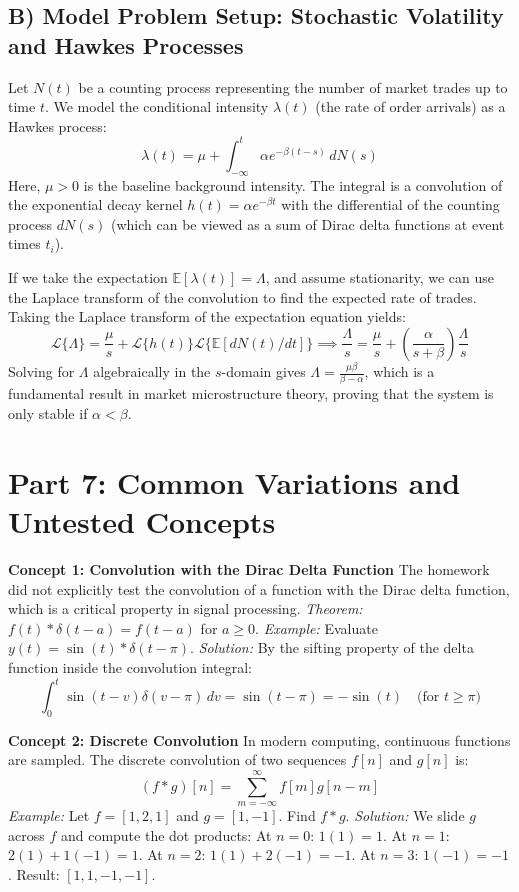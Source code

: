 \documentclass[11pt, letterpaper]{article}
\theoremstyle{definition}
\theoremstyle{remark}
\newcommand{\E}{\mathbb{E}}
\begin{document}
\subsection{B) Model Problem Setup: Stochastic Volatility and Hawkes Processes}
Let $N(t)$ be a counting process representing the number of market trades up to time $t$. We model the conditional intensity $\lambda(t)$ (the rate of order arrivals) as a Hawkes process:
\[
\lambda(t) = \mu + \int_{-\infty}^t \alpha e^{-\beta(t-s)} \, dN(s)
\]
Here, $\mu > 0$ is the baseline background intensity. The integral is a convolution of the exponential decay kernel $h(t) = \alpha e^{-\beta t}$ with the differential of the counting process $dN(s)$ (which can be viewed as a sum of Dirac delta functions at event times $t_i$). 

If we take the expectation $\E[\lambda(t)] = \Lambda$, and assume stationarity, we can use the Laplace transform of the convolution to find the expected rate of trades. Taking the Laplace transform of the expectation equation yields:
\[
\mathscr{L}\{\Lambda\} = \frac{\mu}{s} + \mathscr{L}\{h(t)\} \mathscr{L}\{\E[dN(t)/dt]\} \implies \frac{\Lambda}{s} = \frac{\mu}{s} + \left(\frac{\alpha}{s+\beta}\right)\frac{\Lambda}{s}
\]
Solving for $\Lambda$ algebraically in the $s$-domain gives $\Lambda = \frac{\mu \beta}{\beta - \alpha}$, which is a fundamental result in market microstructure theory, proving that the system is only stable if $\alpha < \beta$.

\newpage
\section{Part 7: Common Variations and Untested Concepts}

\textbf{Concept 1: Convolution with the Dirac Delta Function}
The homework did not explicitly test the convolution of a function with the Dirac delta function, which is a critical property in signal processing.
\textit{Theorem:} $f(t) * \delta(t-a) = f(t-a)$ for $a \ge 0$.
\textit{Example:} Evaluate $y(t) = \sin(t) * \delta(t-\pi)$.
\textit{Solution:} By the sifting property of the delta function inside the convolution integral:
\[
\int_0^t \sin(t-v)\delta(v-\pi) \, dv = \sin(t-\pi) = -\sin(t) \quad \text{(for } t \ge \pi \text{)}
\]

\textbf{Concept 2: Discrete Convolution}
In modern computing, continuous functions are sampled. The discrete convolution of two sequences $f[n]$ and $g[n]$ is:
\[
(f * g)[n] = \sum_{m=-\infty}^{\infty} f[m]g[n-m]
\]
\textit{Example:} Let $f = [1, 2, 1]$ and $g = [1, -1]$. Find $f * g$.
\textit{Solution:} We slide $g$ across $f$ and compute the dot products:
At $n=0$: $1(1) = 1$.
At $n=1$: $2(1) + 1(-1) = 1$.
At $n=2$: $1(1) + 2(-1) = -1$.
At $n=3$: $1(-1) = -1$.
Result: $[1, 1, -1, -1]$.
\end{document}
